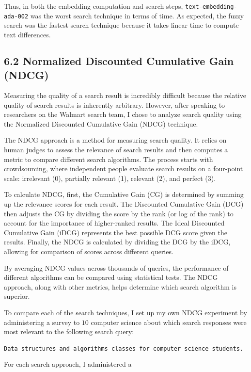 \documentclass[
	a4paper, %
	10pt, %
	unnumberedsections, %
	twoside, %
]{LTJournalArticle}
\begin{document}
Thus, in both the embedding computation and search steps, \texttt{text-embedding-ada-002} was the worst search technique in terms of time. As expected, the fuzzy search was the fastest search technique because it takes linear time to compute text differences. 

\subsection{6.2 Normalized Discounted Cumulative Gain (NDCG)}

Measuring the quality of a search result is incredibly difficult because the relative quality of search results is inherently arbitrary. However, after speaking to researchers on the Walmart search team, I chose to analyze search quality using the Normalized Discounted Cumulative Gain (NDCG) technique. 

The NDCG approach is a method for measuring search quality. It relies on human judges to assess the relevance of search results and then computes a metric to compare different search algorithms. The process starts with crowdsourcing, where independent people evaluate search results on a four-point scale: irrelevant (0), partially relevant (1), relevant (2), and perfect (3).

To calculate NDCG, first, the Cumulative Gain (CG) is determined by summing up the relevance scores for each result. The Discounted Cumulative Gain (DCG) then adjusts the CG by dividing the score by the rank (or log of the rank) to account for the importance of higher-ranked results. The Ideal Discounted Cumulative Gain (iDCG) represents the best possible DCG score given the results. Finally, the NDCG is calculated by dividing the DCG by the iDCG, allowing for comparison of scores across different queries.

By averaging NDCG values across thousands of queries, the performance of different algorithms can be compared using statistical tests. The NDCG approach, along with other metrics, helps determine which search algorithm is superior.

To compare each of the search techniques, I set up my own NDCG experiment 
by administering a survey to $10$ computer science about which search responses were most relevant to the following search query: 
\begin{center}
	\texttt{Data structures and algorithms classes for computer science students.}
\end{center}

For each search approach, I administered a 




\end{document}
